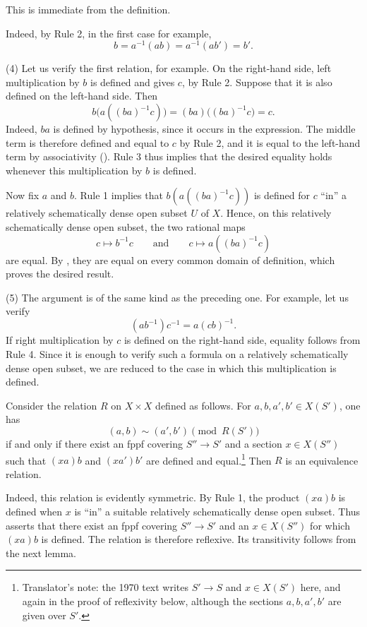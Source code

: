 \textup{} This is immediate from the definition.

\textup{} Indeed, by Rule 2, in the first case for example,
\[
  b=a^{-1}(ab)=a^{-1}(ab')=b'.
\]

\textup{(4)} Let us verify the first relation, for example. On the
right-hand side, left multiplication by \(b\) is defined and gives
\(c\), by Rule 2. Suppose that it is also defined on the
left-hand side. Then
\[
  b\bigl(a((ba)^{-1}c)\bigr)
  =(ba)\bigl((ba)^{-1}c\bigr)
  =c.
\]
Indeed, \(ba\) is defined by hypothesis, since it occurs in the
expression. The middle term is therefore defined and equal to
\(c\) by Rule 2, and it is equal to the left-hand term by
associativity (). Rule 3 thus implies that the desired
equality holds whenever this multiplication by \(b\) is defined.

Now fix \(a\) and \(b\). Rule 1 implies that
\(b(a((ba)^{-1}c))\) is defined for \(c\) ``in'' a relatively
schematically dense open subset \(U\) of \(X\). Hence, on this
relatively schematically dense open subset, the two rational maps
\[
  c\longmapsto b^{-1}c
  \qquad\text{and}\qquad
  c\longmapsto a((ba)^{-1}c)
\]
are equal. By , they are equal on every common domain of
definition, which proves the desired result.

\textup{(5)} The argument is of the same kind as the preceding
one. For example, let us verify
\[
  (ab^{-1})c^{-1}=a(cb)^{-1}.
\]
If right multiplication by \(c\) is defined on the right-hand
side, equality follows from Rule 4. Since it is enough to verify
such a formula on a relatively schematically dense open subset, we
are reduced to the case in which this multiplication is defined.

%
Consider the relation \(R\) on \(X\times X\) defined as follows.
For \(a,b,a',b'\in X(S')\), one has
\[
  (a,b)\sim(a',b')\pmod{R(S')}
\]
if and only if there exist an fppf covering \(S''\to S'\) and a
section \(x\in X(S'')\) such that \((xa)b\) and \((xa')b'\) are
defined and equal.\footnote{Translator's note: the 1970 text writes \(S'\to S\) and
\(x\in X(S')\) here, and again in the proof of reflexivity below, although the sections \(a,b,a',b'\)
are given over \(S'\).} Then \(R\) is an equivalence relation.

Indeed, this relation is evidently symmetric. By Rule 1, the
product \((xa)b\) is defined when \(x\) is ``in'' a suitable
relatively schematically dense open subset. Thus  asserts that
there exist an fppf covering \(S''\to S'\) and an
\(x\in X(S'')\) for which \((xa)b\) is defined. The relation is
therefore reflexive. Its transitivity follows from the next lemma.

